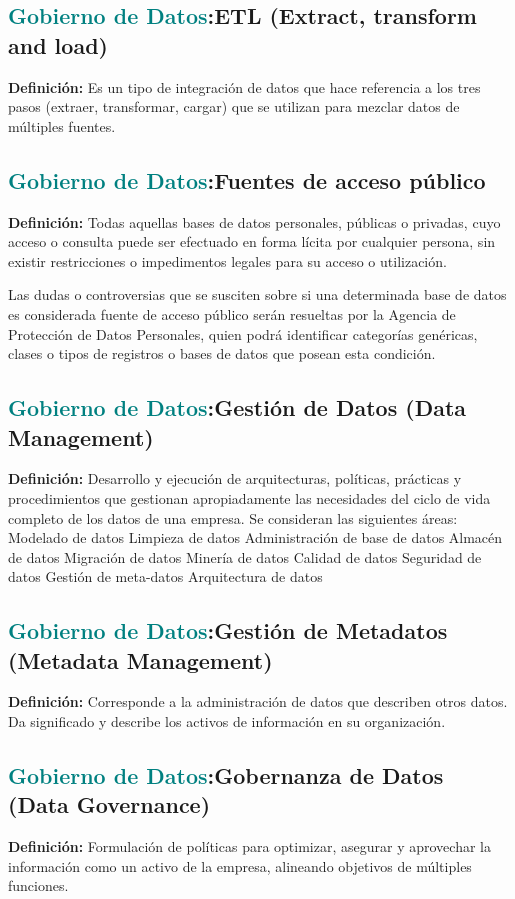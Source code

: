 \documentclass[12pt]{article}
\begin{document}
\subsection{\textcolor{teal}{Gobierno de Datos}:{ETL (Extract, transform and load)}}
\textbf{Definición:} Es un tipo de integración de datos que hace referencia a los tres pasos (extraer, transformar, cargar) que se utilizan para mezclar datos de múltiples fuentes.
\subsection{\textcolor{teal}{Gobierno de Datos}:{Fuentes de acceso público}}
\textbf{Definición:} Todas aquellas bases de datos personales, públicas o privadas, cuyo acceso o consulta puede ser efectuado en forma lícita por cualquier persona, sin existir restricciones o impedimentos legales para su acceso o utilización.

Las dudas o controversias que se susciten sobre si una determinada base de datos es considerada fuente de acceso público serán resueltas por la Agencia de Protección de Datos Personales, quien podrá identificar categorías genéricas, clases o tipos de registros o bases de datos que posean esta condición.
\subsection{\textcolor{teal}{Gobierno de Datos}:{Gestión de Datos (Data Management)}}
\textbf{Definición:} Desarrollo y ejecución de arquitecturas, políticas, prácticas y procedimientos que gestionan apropiadamente las necesidades del ciclo de vida completo de los datos de una empresa. Se consideran las siguientes áreas:
Modelado de datos
Limpieza de datos
Administración de base de datos
Almacén de datos
Migración de datos
Minería de datos
Calidad de datos
Seguridad de datos
Gestión de meta-datos
Arquitectura de datos
\subsection{\textcolor{teal}{Gobierno de Datos}:{Gestión de Metadatos (Metadata Management)}}
\textbf{Definición:} Corresponde a la administración de datos que describen otros datos. Da significado y describe los activos de información en su organización.
\subsection{\textcolor{teal}{Gobierno de Datos}:{Gobernanza de Datos (Data Governance)}}
\textbf{Definición:} Formulación de políticas para optimizar, asegurar y aprovechar la información como un activo de la empresa, alineando objetivos de múltiples funciones.
\end{document}
